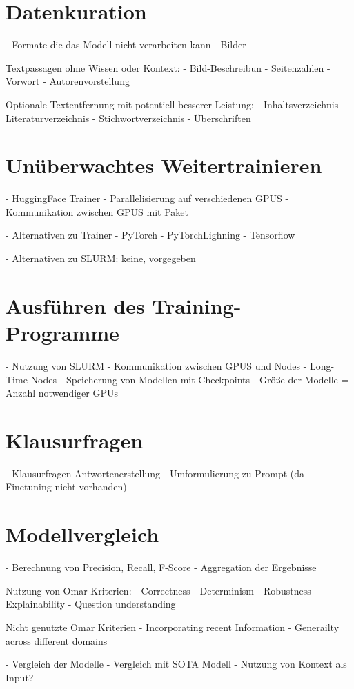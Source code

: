 \section{Datenkuration}

- Formate die das Modell nicht verarbeiten kann
    - Bilder

Textpassagen ohne Wissen oder Kontext:
    - Bild-Beschreibun
    - Seitenzahlen
    - Vorwort
    - Autorenvorstellung

Optionale Textentfernung mit potentiell besserer Leistung:
    - Inhaltsverzeichnis
    - Literaturverzeichnis
    - Stichwortverzeichnis
    - Überschriften

\section{Unüberwachtes Weitertrainieren}
- HuggingFace Trainer
- Parallelisierung auf verschiedenen GPUS
- Kommunikation zwischen GPUS mit Paket

- Alternativen zu Trainer
    - PyTorch
    - PyTorchLighning
    - Tensorflow

- Alternativen zu SLURM: keine, vorgegeben

\section{Ausführen des Training-Programme}
- Nutzung von SLURM
- Kommunikation zwischen GPUS und Nodes
- Long-Time Nodes
- Speicherung von Modellen mit Checkpoints
- Größe der Modelle = Anzahl notwendiger GPUs

\section{Klausurfragen}
- Klausurfragen Antwortenerstellung
- Umformulierung zu Prompt (da Finetuning nicht vorhanden)

\section{Modellvergleich}
- Berechnung von Precision, Recall, F-Score
- Aggregation der Ergebnisse

Nutzung von Omar Kriterien:
    - Correctness
    - Determinism
    - Robustness
    - Explainability
    - Question understanding

Nicht genutzte Omar Kriterien
    - Incorporating recent Information
    - Generailty across different domains
    
- Vergleich der Modelle
- Vergleich mit SOTA Modell
    - Nutzung von Kontext als Input?

